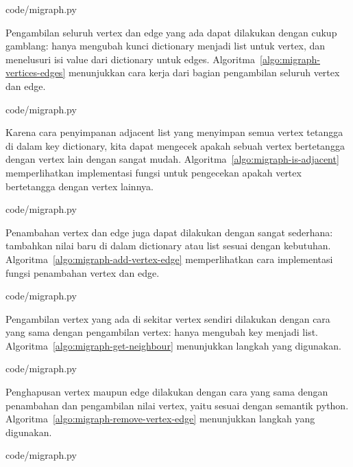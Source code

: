 
                {code/migraph.py}

Pengambilan seluruh vertex dan edge yang ada dapat dilakukan dengan cukup gamblang: hanya mengubah kunci dictionary menjadi list untuk vertex, dan menelusuri isi value dari dictionary untuk edges. Algoritma~\ref{algo:migraph-vertices-edges} menunjukkan cara kerja dari bagian pengambilan seluruh vertex dan edge.


                {code/migraph.py}

Karena cara penyimpanan adjacent list yang menyimpan semua vertex tetangga di dalam key dictionary, kita dapat mengecek apakah sebuah vertex bertetangga dengan vertex lain dengan sangat mudah. Algoritma~\ref{algo:migraph-is-adjacent} memperlihatkan implementasi fungsi untuk pengecekan apakah vertex bertetangga dengan vertex lainnya.


                {code/migraph.py}

Penambahan vertex dan edge juga dapat dilakukan dengan sangat sederhana: tambahkan nilai baru di dalam dictionary atau list sesuai dengan kebutuhan. Algoritma~\ref{algo:migraph-add-vertex-edge} memperlihatkan cara implementasi fungsi penambahan vertex dan edge.


                {code/migraph.py}

Pengambilan vertex yang ada di sekitar vertex sendiri dilakukan dengan cara yang sama dengan pengambilan vertex: hanya mengubah key menjadi list. Algoritma~\ref{algo:migraph-get-neighbour} menunjukkan langkah yang digunakan.


                {code/migraph.py}

Penghapusan vertex maupun edge dilakukan dengan cara yang sama dengan penambahan dan pengambilan nilai vertex, yaitu sesuai dengan semantik python. Algoritma~\ref{algo:migraph-remove-vertex-edge} menunjukkan langkah yang digunakan.


                {code/migraph.py}

